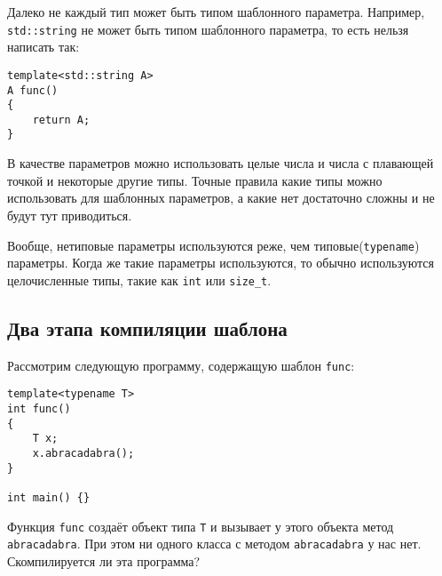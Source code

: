 \documentclass{article}
\begin{document}
Далеко не каждый тип может быть типом шаблонного параметра. Например, \texttt{std::string}  не может быть типом шаблонного параметра, то есть нельзя написать так:
\begin{lstlisting}
template<std::string A>
A func() 
{
    return A;
}
\end{lstlisting}
В качестве параметров можно использовать целые числа и числа с плавающей точкой и некоторые другие типы. Точные правила какие типы можно использовать для шаблонных параметров, а какие нет достаточно сложны и не будут тут приводиться.

Вообще, нетиповые параметры используются реже, чем типовые(\texttt{typename}) параметры. Когда же такие параметры используются, то обычно используются целочисленные типы, такие как \texttt{int} или \texttt{size\_t}.

\subsection*{Два этапа компиляции шаблона}
Рассмотрим следующую программу, содержащую шаблон \texttt{func}:
\begin{lstlisting}
template<typename T>
int func() 
{
    T x;
    x.abracadabra();
}

int main() {}
\end{lstlisting}

Функция \texttt{func} создаёт объект типа \texttt{T} и вызывает у этого объекта метод \texttt{abracadabra}. При этом ни одного класса с методом \texttt{abracadabra} у нас нет.
Скомпилируется ли эта программа?
\end{document}
